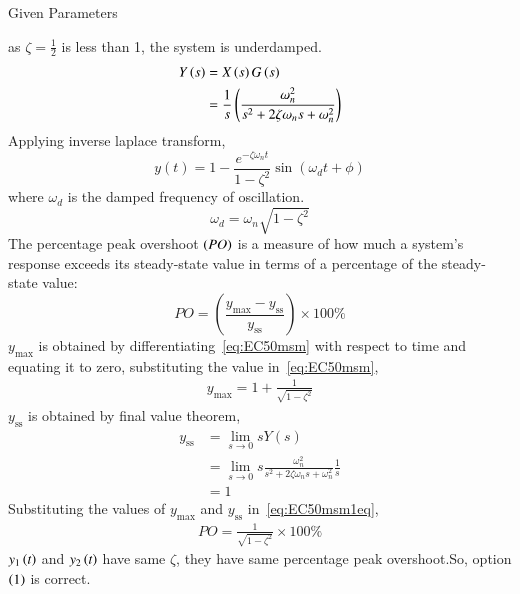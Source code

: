 \documentclass[journal,12pt,onecolumn]{IEEEtran}
\theoremstyle{remark}
\begin{document}
    \begin{table}[h!]
 	\centering
 	\resizebox{6 cm}{!}{
 		
 	}
 	\caption{Given Parameters}
 	\label{tab:msmECgate50tab2}
     \end{table} 
    as $\zeta = \frac{1}{2}$ is less than 1, the system is underdamped.
    \begin{align}
    Y\left(s\right) &= X\left(s\right) G\left(s\right)\\
    &= \frac{1}{s} \left(\frac{\omega_n^2}{s^2 + 2\zeta\omega_n s + \omega_n^2}\right)  
    \end{align}
    Applying inverse laplace transform,
    \begin{equation}
    y(t) = 1 - \frac{e^{-\zeta \omega_n t}}{1 - \zeta^2} \sin(\omega_d t + \phi)
    \label{eq:EC50msm}
    \end{equation}
    where $\omega_{d}$ is the damped frequency of oscillation.
    \begin{equation}
    \omega_{d} = \omega_{n}\sqrt{1 - {\zeta}^2}
    \label{eq:EC50msm2eq}
    \end{equation}
    The percentage peak overshoot $\left(PO\right)$ is a measure of how much a system's response exceeds its steady-state value in terms of a percentage of the steady-state value:
    \begin{equation}
    PO = \left( \frac{y_{\text{max}} - y_{\text{ss}}}{y_{\text{ss}}} \right) \times 100\%
    \label{eq:EC50msm1eq}
    \end{equation}
    $y_{\text{max}}$ is obtained by differentiating~\eqref{eq:EC50msm} with respect to time and equating it to zero, substituting the value in~\eqref{eq:EC50msm},
    \begin{align}
    y_{\text{max}} = 1 + \frac{1}{\sqrt{1-{\zeta}^2}}
    \end{align}
    $y_{\text{ss}}$ is obtained by final value theorem,
    \begin{align}
    y_{\text{ss}} &= \lim_{{s \to 0}} sY(s)\\
    &= \lim_{{s \to 0}} s\frac{\omega_n^2}{s^2 + 2\zeta\omega_n s + \omega_n^2} \frac{1}{s}\\
    &= 1
    \end{align} 
    Substituting the values of $y_{\text{max}}$ and $y_{\text{ss}}$ in~\eqref{eq:EC50msm1eq}, 
    \begin{align}
    PO = \frac{1}{\sqrt{1-{\zeta}^2}} \times 100\%
    \end{align}
    $y_{1}\left(t\right)$ and $y_{2}\left(t\right)$ have same $\zeta$, they have same percentage peak overshoot.So, option $\left(1\right)$ is correct.\\
\end{document}
